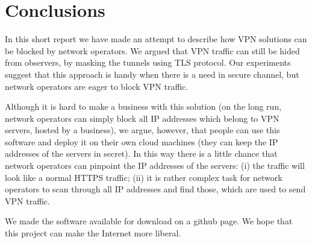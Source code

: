 \section{Conclusions}
\label{section:conclusion}

In this short report we have made an attempt to describe how VPN solutions
can be blocked by network operators. We argued that VPN traffic can still be
hided from observers, by masking the tunnels using TLS protocol. 
Our experiments suggest that this approach is handy when there is a need
in secure channel, but network operators are eager to block VPN traffic.

Although it is hard to make a business with this solution (on the long
run, network operators can simply block all IP addresses which belong to VPN servers,
hosted by a business), we argue, however, that people can use this software
and deploy it on their own cloud machines (they can keep the IP addresses 
of the servers in secret). In this way there is a little chance
that network operators can pinpoint the IP addresses of the servers: (i)
the traffic will look like a normal HTTPS traffic; (ii) it is rather complex task
for network operators to scan through all IP addresses and find those, which 
are used to send VPN traffic.

We made the software available for download on a github page. We hope that 
this project can make the Internet more liberal.